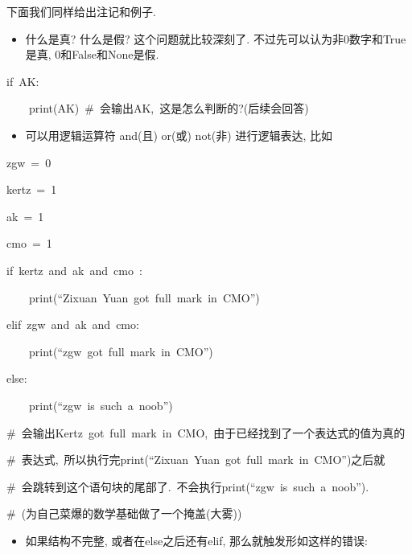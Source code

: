 下面我们同样给出注记和例子.
\begin{itemize}
\item 什么是真? 什么是假? 这个问题就比较深刻了. 不过先可以认为非0数字和True是真, 0和False和None是假. 
\end{itemize}
\begin{lyxcode}
if~\textquotedbl AK\textquotedbl :

~~~~print(\textquotedbl AK\textquotedbl )~\#~会输出AK,~这是怎么判断的?(后续会回答)
\end{lyxcode}
\begin{itemize}
\item 可以用逻辑运算符 and(且) or(或) not(非) 进行逻辑表达, 比如
\end{itemize}
\begin{lyxcode}
zgw~=~0

kertz~=~1

ak~=~1

cmo~=~1

if~kertz~and~ak~and~cmo~:

~~~~print(``Zixuan~Yuan~got~full~mark~in~CMO'')

elif~zgw~and~ak~and~cmo:

~~~~print(``zgw~got~full~mark~in~CMO'')

else:

~~~~print(``zgw~is~such~a~noob'')

\#~会输出Kertz~got~full~mark~in~CMO,~由于已经找到了一个表达式的值为真的

\#~表达式,~所以执行完print(``Zixuan~Yuan~got~full~mark~in~CMO'')之后就

\#~会跳转到这个语句块的尾部了.~不会执行print(``zgw~is~such~a~noob'').

\#~(为自己菜爆的数学基础做了一个掩盖(大雾))
\end{lyxcode}
\begin{itemize}
\item 如果结构不完整, 或者在else之后还有elif, 那么就触发形如这样的错误:
\end{itemize}

